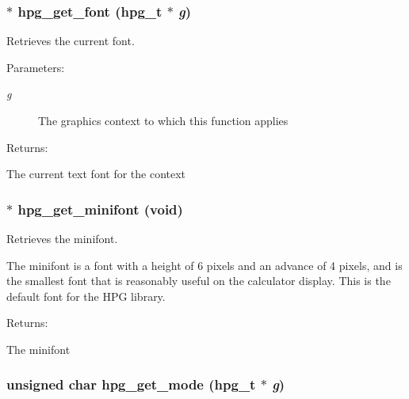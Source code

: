 \subsubsection{$\ast$ hpg\_\-get\_\-font ({\bf hpg\_\-t} $\ast$ {\em g})}\label{hpgraphics_8h_a68}


Retrieves the current font.

\begin{Desc}
\item[Parameters: ]\par
\begin{description}
\item[{\em 
g}]The graphics context to which this function applies \end{description}
\end{Desc}
\begin{Desc}
\item[Returns: ]\par
The current text font for the context \end{Desc}
\subsubsection{$\ast$ hpg\_\-get\_\-minifont (void)}\label{hpgraphics_8h_a56}


Retrieves the minifont.

The minifont is a font with a height of 6 pixels and an advance of 4 pixels, and is the smallest font that is reasonably useful on the calculator display. This is the default font for the HPG library.

\begin{Desc}
\item[Returns: ]\par
The minifont \end{Desc}
\subsubsection{\setlength{\rightskip}{0pt plus 5cm}unsigned char hpg\_\-get\_\-mode ({\bf hpg\_\-t} $\ast$ {\em g})}\label{hpgraphics_8h_a64}



